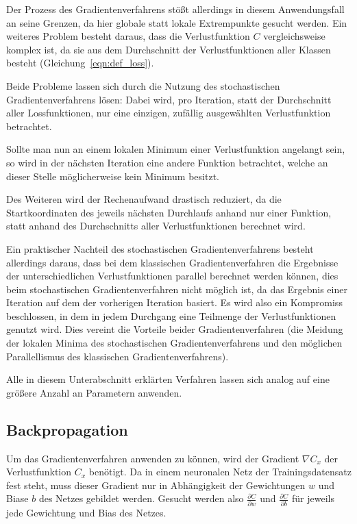 Der Prozess des Gradientenverfahrens stößt allerdings in diesem Anwendungsfall an seine Grenzen, da hier globale statt lokale Extrempunkte gesucht werden. Ein weiteres Problem besteht daraus, dass die Verlustfunktion $C$ vergleichsweise komplex ist, da sie aus dem Durchschnitt der Verlustfunktionen aller Klassen besteht (\vgl Gleichung~\ref{eqn:def_loss}).

Beide Probleme lassen sich durch die Nutzung des stochastischen Gradientenverfahrens lösen: Dabei wird, pro Iteration, statt der Durchschnitt aller Lossfunktionen, nur eine einzigen, zufällig ausgewählten Verlustfunktion betrachtet. \cite{kathuria_18}

Sollte man nun an einem lokalen Minimum einer Verlustfunktion angelangt sein, so wird in der nächsten Iteration eine andere Funktion betrachtet, welche an dieser Stelle möglicherweise kein Minimum besitzt.

Des Weiteren wird der Rechenaufwand drastisch reduziert, da die Startkoordinaten des jeweils nächsten Durchlaufs anhand nur einer Funktion, statt anhand des Durchschnitts aller Verlustfunktionen berechnet wird.

Ein praktischer Nachteil des stochastischen Gradientenverfahrens besteht allerdings daraus, dass bei dem klassischen Gradientenverfahren die Ergebnisse der unterschiedlichen Verlustfunktionen parallel berechnet werden können, dies beim stochastischen Gradientenverfahren nicht möglich ist, da das Ergebnis einer Iteration auf dem der vorherigen Iteration basiert. Es wird also ein Kompromiss beschlossen, in dem in jedem Durchgang eine Teilmenge der Verlustfunktionen genutzt wird. \cite{kathuria_18} Dies vereint die Vorteile beider Gradientenverfahren (die Meidung der lokalen Minima des stochastischen Gradientenverfahrens und den möglichen Parallellismus des klassischen Gradientenverfahrens).

Alle in diesem Unterabschnitt erklärten Verfahren lassen sich analog auf eine größere Anzahl an Parametern anwenden.

\subsection{Backpropagation}
\label{sec:backpropagation}

Um das Gradientenverfahren anwenden zu können, wird der Gradient $\nabla C_x$ der Verlustfunktion $C_x$ benötigt. Da in einem neuronalen Netz der Trainingsdatensatz fest steht, muss dieser Gradient nur in Abhängigkeit der Gewichtungen $w$ und Biase $b$ des Netzes gebildet werden. Gesucht werden also $\frac{\partial C}{\partial w}$ und $\frac{\partial C}{\partial b}$ für jeweils jede Gewichtung und Bias des Netzes.

